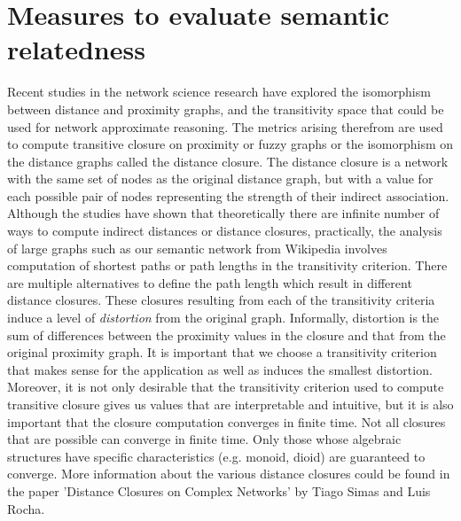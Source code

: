 \documentclass[12pt]{article}
\begin{document}
\section{Measures to evaluate semantic relatedness}
Recent studies in the network science research have explored the isomorphism between distance and proximity graphs, and the transitivity space that could be used for network approximate reasoning. The metrics arising therefrom are used to compute transitive closure on proximity or fuzzy graphs or the isomorphism on the distance graphs called the distance closure. The distance closure is a network with the same set of nodes as the original distance graph, but with a value for each possible pair of nodes representing the strength of their indirect association. Although the studies have shown that theoretically there are infinite number of ways to compute indirect distances or distance closures, practically, the analysis of large graphs such as our semantic network from Wikipedia involves computation of shortest paths or path lengths in the transitivity criterion. There are multiple alternatives to define the path length which result in different distance closures. These closures resulting from each of the transitivity criteria induce a level of \textit{distortion} from the original graph. Informally, distortion is the sum of differences between the proximity values in the closure and that from the original proximity graph. It is important that we choose a transitivity criterion that makes sense for the application as well as induces the smallest distortion. Moreover, it is not only desirable that the transitivity criterion used to compute transitive closure gives us values that are interpretable and intuitive, but it is also important that the closure computation converges in finite time. Not all closures that are possible can converge in finite time. Only those whose algebraic structures have specific characteristics (e.g. monoid, dioid) are guaranteed to converge. More information about the various distance closures could be found in the paper 'Distance Closures on Complex Networks' by Tiago Simas and Luis Rocha. 
\end{document}
